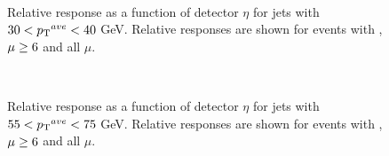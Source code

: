 \begin{figure}
\centering
\mbox{
}
\caption[Relative response as a function of $\eta$ for 2 different pileup conditions, based on $\mu{}$, for jets with $30<\ptave{}<40$ GeV]{
Relative response as a function of detector $\eta$ for jets with $30<\ptave{}<40$ GeV.
Relative responses are shown for events with , $\rm \mu\ge6$ and all $\mu$. 
\label{JetPerf:MuComp_j15}}
\end{figure}

\begin{figure}
\centering
\mbox{
}
\caption[Relative response as a function of $\eta$ for 2 different pileup conditions, based on $\mu{}$, for jets with $55<\ptave{}<75$ GeV]{
Relative response as a function of detector $\eta$ for jets with $55<\ptave{}<75$ GeV.
Relative responses are shown for events with , $\rm \mu\ge6$ and all $\mu$. 
\label{JetPerf:MuComp_j20}}
\end{figure}

